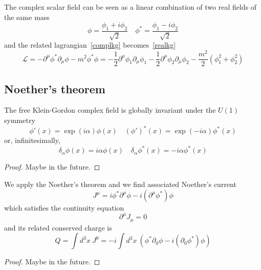     The complex scalar field can be seen as a linear combination of two real fields of the same mass 
    \begin{equation*}
        \phi = \frac{\phi_1 + i \phi_2}{\sqrt{2}} \quad \phi^* = \frac{\phi_1 - i \phi_2}{\sqrt{2}}
    \end{equation*}
    and the related lagrangian~\eqref{complkg} becomes~\eqref{realkg}
    \begin{equation*}
        \mathcal L = - \partial^\mu \phi^* \partial_\mu \phi - m^2 \phi^* \phi = -\frac{1}{2} \partial^\mu \phi_1 \partial_\mu \phi_1 - \frac{1}{2} \partial^\mu \phi_2 \partial_\mu \phi_2 - \frac{m^2}{2} (\phi_1^2 + \phi^2_2) 
    \end{equation*}

\subsection{Noether's theorem}

    The free Klein-Gordon complex field is globally invariant under the $U(1)$ symmetry
    \begin{equation*}
        \phi'(x) = \exp(i \alpha) \phi(x) \quad (\phi')^*(x) = \exp(- i \alpha) \phi^*(x)
    \end{equation*}
    or, infinitesimally,
    \begin{equation*}
        \delta_\alpha \phi (x) = i \alpha \phi(x) \quad \delta_\alpha \phi^* (x) = - i \alpha \phi^*(x)
    \end{equation*}

    \begin{proof}
        Maybe in the future.
    \end{proof}

    We apply the Noether's theorem and we find associated Noether's current
    \begin{equation*}
        J^\mu = i \phi^* \partial^\mu \phi - i (\partial^\mu \phi^*) \phi
    \end{equation*}
    which satisfies the continuity equation 
    \begin{equation*}
        \partial^\mu J_\mu = 0
    \end{equation*}
    and its related conserved charge is 
    \begin{equation*}
        Q = \int d^3 x ~ J^0 = - i \int d^3 x ~ (\phi^* \partial_0 \phi - i (\partial_0 \phi^*) \phi)
    \end{equation*}

    \begin{proof}
        Maybe in the future.
    \end{proof}

